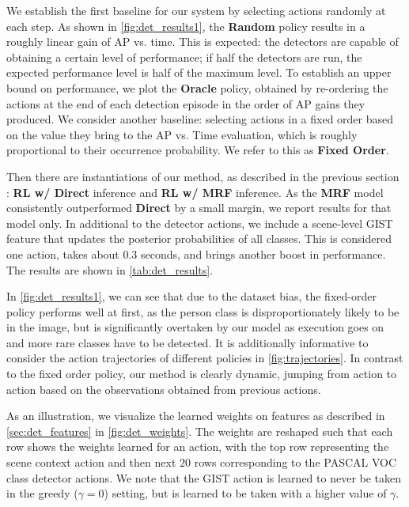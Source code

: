 We establish the first baseline for our system by selecting actions randomly at each step.
As shown in \autoref{fig:det_results1}, the \textbf{Random} policy results in a roughly linear gain of AP vs. time.
This is expected: the detectors are capable of obtaining a certain level of performance; if half the detectors are run, the expected performance level is half of the maximum level.
To establish an upper bound on performance, we plot the \textbf{Oracle} policy, obtained by re-ordering the actions at the end of each detection episode in the order of AP gains they produced.
We consider another baseline: selecting actions in a fixed order based on the value they bring to the AP vs. Time evaluation, which is roughly proportional to their occurrence probability.
We refer to this as \textbf{Fixed Order}.

Then there are instantiations of our method, as described in the previous section : \textbf{RL w/ Direct} inference and \textbf{RL w/ MRF} inference.
As the \textbf{MRF} model consistently outperformed \textbf{Direct} by a small margin, we report results for that model only.
In additional to the detector actions, we include a scene-level GIST feature that updates the posterior probabilities of all classes.
This is considered one action, takes about $0.3$ seconds, and brings another boost in performance.
The results are shown in \autoref{tab:det_results}.



In \autoref{fig:det_results1}, we can see that due to the dataset bias, the fixed-order policy performs well at first, as the person class is disproportionately likely to be in the image, but is significantly overtaken by our model as execution goes on and more rare classes have to be detected.
It is additionally informative to consider the action trajectories of different policies in \autoref{fig:trajectories}.
In contrast to the fixed order policy, our method is clearly dynamic, jumping from action to action based on the observations obtained from previous actions.



As an illustration, we visualize the learned weights on features as described in \autoref{sec:det_features} in \autoref{fig:det_weights}.
The weights are reshaped such that each row shows the weights learned for an action, with the top row representing the scene context action and then next $20$ rows corresponding to the PASCAL VOC class detector actions.
We note that the GIST action is learned to never be taken in the greedy ($\gamma=0$) setting, but is learned to be taken with a higher value of $\gamma$.

